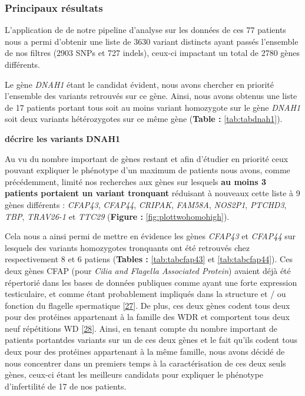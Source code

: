 \documentclass[12pt,twoside]{ugathesis}
\begin{document}


\newpage

\subsubsection{Principaux résultats}\label{principaux-resultats-4}

L'application de de notre pipeline d'analyse sur les données de ces 77
patients nous a permi d'obtenir une liste de 3630 variant distincts
ayant passés l'ensemble de nos filtres (2903 SNPs et 727 indels),
ceux-ci impactant un total de 2780 gènes différents.

Le gène \emph{DNAH1} étant le candidat évident, nous avons chercher en
priorité l'ensemble des variants retrouvés sur ce gène. Ainsi, nous
avons obtenus une liste de 17 patients portant tous soit au moins
variant homozygote sur le gène \emph{DNAH1} soit deux variants
hétérozygotes sur ce même gène (\textbf{Table : }\ref{tab:tabdnah1}).

\textbf{décrire les variants DNAH1}

Au vu du nombre important de gènes restant et afin d'étudier en priorité
ceux pouvant expliquer le phénotype d'un maximum de patients nous avons,
comme précédemment, limité nos recherches aux gènes sur lesquels
\textbf{au moins 3 patients portaient un variant tronquant} réduisant à
nouveaux cette liste à 9 gènes différents : \emph{CFAP43},
\emph{CFAP44}, \emph{CRIPAK}, \emph{FAM58A}, \emph{NOS2P1},
\emph{PTCHD3}, \emph{TBP}, \emph{TRAV26-1} et \emph{TTC29}
(\textbf{Figure : }\ref{fig:plottwohomohigh}).

Cela nous a ainsi permi de mettre en évidence les gènes \emph{CFAP43} et
\emph{CFAP44} sur lesquels des variants homozygotes tronquants ont été
retrouvés chez respectivement 8 et 6 patiens (\textbf{Tables :
}\ref{tab:tabcfap43} et \ref{tab:tabcfap44}). Ces deux gènes CFAP (pour
\emph{Cilia and Flagella Associated Protein}) avaient déjà été
répertorié dans les bases de données publiques comme ayant une forte
expression testiculaire, et comme étant probablement impliqués dans la
structure et / ou fonction du flagelle spermatique
{[}\protect\hyperlink{ref-Ivliev2012}{27}{]}. De plus, ces deux gènes
codent tous deux pour des protéines appartenant à la famille des WDR et
comportent tous deux neuf répétitions WD
{[}\protect\hyperlink{ref-Smith2008}{28}{]}. Ainsi, en tenant compte du
nombre important de patients portantdes variants sur un de ces deux
gènes et le fait qu'ils codent tous deux pour des protéines appartenant
à la même famille, nous avons décidé de nous concentrer dans un premiers
temps à la caractérisation de ces deux seuls gènes, ceux-ci étant les
meilleurs candidats pour expliquer le phénotype d'infertilité de 17 de
nos patients.
\end{document}

